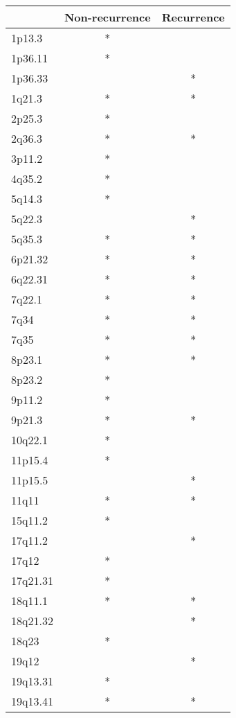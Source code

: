 \begin{tabular}{lcc}
\toprule
{} & Non-recurrence & Recurrence \\
\midrule
1p13.3   &              * &            \\
1p36.11  &              * &            \\
1p36.33  &                &          * \\
1q21.3   &              * &          * \\
2p25.3   &              * &            \\
2q36.3   &              * &          * \\
3p11.2   &              * &            \\
4q35.2   &              * &            \\
5q14.3   &              * &            \\
5q22.3   &                &          * \\
5q35.3   &              * &          * \\
6p21.32  &              * &          * \\
6q22.31  &              * &          * \\
7q22.1   &              * &          * \\
7q34     &              * &          * \\
7q35     &              * &          * \\
8p23.1   &              * &          * \\
8p23.2   &              * &            \\
9p11.2   &              * &            \\
9p21.3   &              * &          * \\
10q22.1  &              * &            \\
11p15.4  &              * &            \\
11p15.5  &                &          * \\
11q11    &              * &          * \\
15q11.2  &              * &            \\
17q11.2  &                &          * \\
17q12    &              * &            \\
17q21.31 &              * &            \\
18q11.1  &              * &          * \\
18q21.32 &                &          * \\
18q23    &              * &            \\
19q12    &                &          * \\
19q13.31 &              * &            \\
19q13.41 &              * &          * \\
\bottomrule
\end{tabular}
